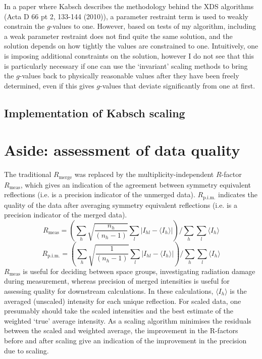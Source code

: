 \documentclass[11pt, oneside]{article}   	%
\begin{document}
In a paper where Kabsch describes the methodology behind the XDS algorithms (Acta D 66 pt 2, 133-144 (2010)), a parameter restraint term is used to weakly constrain the $g$-values to one. However, based on tests of my algorithm, including a weak parameter restraint does not find quite the same solution, and the solution depends on how tightly the values are constrained to one. Intuitively, one is imposing additional constraints on the solution, however I do not see that this is particularly necessary if one can use the `invariant' scaling methods to bring the $g$-values back to physically reasonable values after they have been freely determined, even if this gives $g$-values that deviate significantly from one at first.

\subsection{Implementation of Kabsch scaling}


\section{Aside: assessment of data quality}

The traditional $R_{\text{merge}}$ was replaced by the multiplicity-independent $R$-factor $R_{\text{meas}}$, which gives an indication of the agreement between symmetry equivalent reflections (i.e. is a precision indicator of the unmerged data). $R_{\text{p.i.m.}}$ indicates the quality of the data after averaging symmetry equivalent reflections (i.e. is a precision indicator of the merged data). 
\begin{equation}
R_{\text{meas}} = \left( \sum_{h} \sqrt{\frac{n_h}{(n_h - 1)}} \sum_l \left| I_{hl} - \langle I_h \rangle \right| \right) / \sum_h \sum_l \langle I_h \rangle
\end{equation}
\begin{equation}
R_{\text{p.i.m.}} = \left( \sum_{h} \sqrt{\frac{1}{(n_h - 1)}} \sum_l \left| I_{hl} - \langle I_h \rangle \right| \right) / \sum_h \sum_l \langle I_h \rangle
\end{equation}
$R_{\text{meas}}$ is useful for deciding between space groups, investigating radiation damage during measurement, whereas precision of merged intensities is useful for assessing quality for downstream calculations. In these calculations, $\langle I_h \rangle$ is the averaged (unscaled) intensity for each unique reflection.
For scaled data, one presumably should take the scaled intensities and the best estimate of the weighted `true' average intensity. As a scaling algorithm minimises the residuals between the scaled and weighted average, the improvement in the R-factors before and after scaling give an indication of the improvement in the precision due to scaling.
\end{document}
